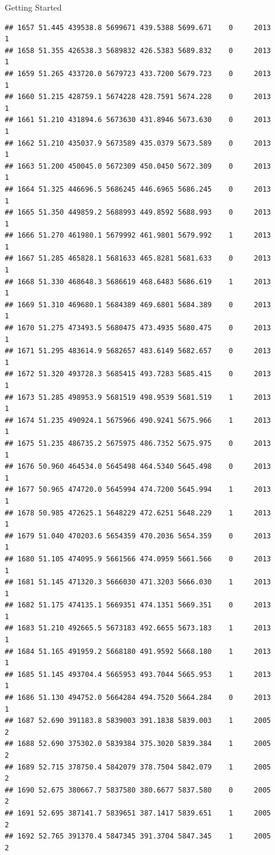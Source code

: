 \documentclass[
  ignorenonframetext,
]{beamer}
\begin{document}
\begin{frame}[fragile]{Getting Started}
\begin{verbatim}
## 1657 51.445 439538.8 5699671 439.5388 5699.671    0     2013        1
## 1658 51.355 426538.3 5689832 426.5383 5689.832    0     2013        1
## 1659 51.265 433720.0 5679723 433.7200 5679.723    0     2013        1
## 1660 51.215 428759.1 5674228 428.7591 5674.228    0     2013        1
## 1661 51.210 431894.6 5673630 431.8946 5673.630    0     2013        1
## 1662 51.210 435037.9 5673589 435.0379 5673.589    0     2013        1
## 1663 51.200 450045.0 5672309 450.0450 5672.309    0     2013        1
## 1664 51.325 446696.5 5686245 446.6965 5686.245    0     2013        1
## 1665 51.350 449859.2 5688993 449.8592 5688.993    0     2013        1
## 1666 51.270 461980.1 5679992 461.9801 5679.992    1     2013        1
## 1667 51.285 465828.1 5681633 465.8281 5681.633    0     2013        1
## 1668 51.330 468648.3 5686619 468.6483 5686.619    1     2013        1
## 1669 51.310 469680.1 5684389 469.6801 5684.389    0     2013        1
## 1670 51.275 473493.5 5680475 473.4935 5680.475    0     2013        1
## 1671 51.295 483614.9 5682657 483.6149 5682.657    0     2013        1
## 1672 51.320 493728.3 5685415 493.7283 5685.415    0     2013        1
## 1673 51.285 498953.9 5681519 498.9539 5681.519    1     2013        1
## 1674 51.235 490924.1 5675966 490.9241 5675.966    1     2013        1
## 1675 51.235 486735.2 5675975 486.7352 5675.975    0     2013        1
## 1676 50.960 464534.0 5645498 464.5340 5645.498    0     2013        1
## 1677 50.965 474720.0 5645994 474.7200 5645.994    1     2013        1
## 1678 50.985 472625.1 5648229 472.6251 5648.229    1     2013        1
## 1679 51.040 470203.6 5654359 470.2036 5654.359    0     2013        1
## 1680 51.105 474095.9 5661566 474.0959 5661.566    0     2013        1
## 1681 51.145 471320.3 5666030 471.3203 5666.030    1     2013        1
## 1682 51.175 474135.1 5669351 474.1351 5669.351    0     2013        1
## 1683 51.210 492665.5 5673183 492.6655 5673.183    1     2013        1
## 1684 51.165 491959.2 5668180 491.9592 5668.180    1     2013        1
## 1685 51.145 493704.4 5665953 493.7044 5665.953    1     2013        1
## 1686 51.130 494752.0 5664284 494.7520 5664.284    0     2013        1
## 1687 52.690 391183.8 5839003 391.1838 5839.003    1     2005        2
## 1688 52.690 375302.0 5839384 375.3020 5839.384    1     2005        2
## 1689 52.715 378750.4 5842079 378.7504 5842.079    1     2005        2
## 1690 52.675 380667.7 5837580 380.6677 5837.580    0     2005        2
## 1691 52.695 387141.7 5839651 387.1417 5839.651    1     2005        2
## 1692 52.765 391370.4 5847345 391.3704 5847.345    1     2005        2

\end{verbatim}
\end{frame}
\end{document}
